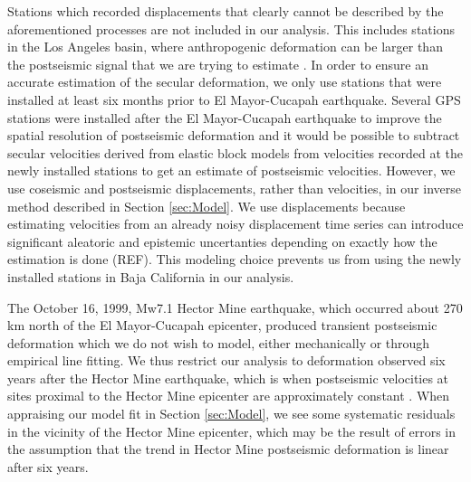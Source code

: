 \documentclass[1p]{elsarticle}
\begin{document}
Stations which recorded displacements that clearly cannot be described by the aforementioned processes are not included in our analysis. This includes stations in the Los Angeles basin, where anthropogenic deformation can be larger than the postseismic signal that we are trying to estimate \citep{Argus2005} . In order to ensure an accurate estimation of the secular deformation, we only use stations that were installed at least six months prior to El Mayor-Cucapah earthquake. Several GPS stations were installed after the El Mayor-Cucapah earthquake to improve the spatial resolution of postseismic deformation \citep{Spinler2015} and it would be possible to subtract secular velocities derived from elastic block models \citep[e.g.][]{Meade2005} from velocities recorded at the newly installed stations to get an estimate of postseismic velocities. However, we use coseismic and postseismic displacements, rather than velocities, in our inverse method described in Section \ref{sec:Model}. We use displacements because estimating velocities from an already noisy displacement time series can introduce significant aleatoric and epistemic uncertanties depending on exactly how the estimation is done (REF). This modeling choice prevents us from using the newly installed stations in Baja California in our analysis.   

The October 16, 1999, Mw7.1 Hector Mine earthquake, which occurred about 270 km north of the El Mayor-Cucapah epicenter, produced transient postseismic deformation which we do not wish to model, either mechanically or through empirical line fitting.  We thus restrict our analysis to deformation observed six years after the Hector Mine earthquake, which is when postseismic velocities at sites proximal to the Hector Mine epicenter are approximately constant \citep{Savage2009}. When appraising our model fit in Section \ref{sec:Model}, we see some systematic residuals in the vicinity of the Hector Mine epicenter, which may be the result of errors in the assumption that the trend in Hector Mine postseismic deformation is linear after six years.   
\end{document}
